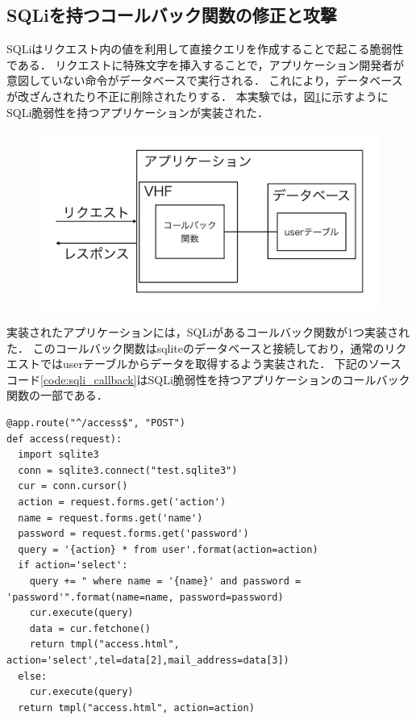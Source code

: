 \documentclass[a4paper,12pt]{jreport}
\begin{document}
\subsection{SQLiを持つコールバック関数の修正と攻撃}
SQLiはリクエスト内の値を利用して直接クエリを作成することで起こる脆弱性である．
リクエストに特殊文字を挿入することで，アプリケーション開発者が意図していない命令がデータベースで実行される．
これにより，データベースが改ざんされたり不正に削除されたりする．
本実験では，図\ref{fig:sqli_application}に示すようにSQLi脆弱性を持つアプリケーションが実装された．
\begin{figure}[hb]
  \begin{center}
    \includegraphics[clip, width=130mm]{./figures/sqli_app.png}
    \label{fig:sqli_application}
  \end{center}
\end{figure}
実装されたアプリケーションには，SQLiがあるコールバック関数が1つ実装された．
このコールバック関数はsqliteのデータベースと接続しており，通常のリクエストではuserテーブルからデータを取得するよう実装された．
下記のソースコード\ref{code:sqli_callback}はSQLi脆弱性を持つアプリケーションのコールバック関数の一部である．
\begin{lstlisting}[caption={SQLi脆弱性を持つコールバック関数}, label=code:sqli_callback, captionpos=b]
@app.route("^/access$", "POST")
def access(request):
  import sqlite3
  conn = sqlite3.connect("test.sqlite3")
  cur = conn.cursor()
  action = request.forms.get('action')
  name = request.forms.get('name')
  password = request.forms.get('password')
  query = '{action} * from user'.format(action=action)
  if action='select':
    query += " where name = '{name}' and password = 'password'".format(name=name, password=password)
    cur.execute(query)
    data = cur.fetchone()
    return tmpl("access.html", action='select',tel=data[2],mail_address=data[3])
  else:
    cur.execute(query)
  return tmpl("access.html", action=action)
\end{lstlisting}
\end{document}

